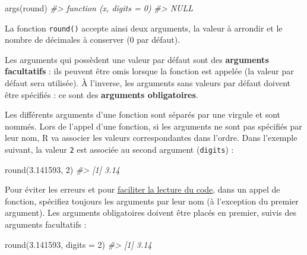 \documentclass[
  french,
]{scrbook}
\newenvironment{Shaded}{\begin{snugshade}}{\end{snugshade}}
\newcommand{\AttributeTok}[1]{\textcolor[rgb]{0.77,0.63,0.00}{#1}}
\newcommand{\CommentTok}[1]{\textcolor[rgb]{0.56,0.35,0.01}{\textit{#1}}}
\newcommand{\DecValTok}[1]{\textcolor[rgb]{0.00,0.00,0.81}{#1}}
\newcommand{\FloatTok}[1]{\textcolor[rgb]{0.00,0.00,0.81}{#1}}
\newcommand{\FunctionTok}[1]{\textcolor[rgb]{0.00,0.00,0.00}{#1}}
\newcommand{\NormalTok}[1]{#1}
\begin{document}
\begin{Shaded}
\begin{Highlighting}[]
\FunctionTok{args}\NormalTok{(round)}
\CommentTok{\#\textgreater{} function (x, digits = 0) }
\CommentTok{\#\textgreater{} NULL}
\end{Highlighting}
\end{Shaded}

La fonction \texttt{round()} accepte ainsi deux arguments, la valeur à arrondir et le nombre de décimales à conserver (0 par défaut).

\begin{tcolorbox}[fonttitle=\sffamily\bfseries\large,title=Remarque,colframe=darkblue]

Les arguments qui possèdent une valeur par défaut sont des \textbf{arguments facultatifs} : ils peuvent être omis lorsque la fonction est appelée (la valeur par défaut sera utilisée). À l'inverse, les arguments sans valeurs par défaut doivent être spécifiés : ce sont des \textbf{arguments obligatoires}.

\end{tcolorbox}

Les différents arguments d'une fonction sont séparés par une virgule et sont nommés. Lors de l'appel d'une fonction, si les arguments ne sont pas spécifiés par leur nom, R va associer les valeurs correspondantes dans l'ordre. Dans l'exemple suivant, la valeur \texttt{2} est associée au second argument (\texttt{digits}) :

\begin{Shaded}
\begin{Highlighting}[]
\FunctionTok{round}\NormalTok{(}\FloatTok{3.141593}\NormalTok{, }\DecValTok{2}\NormalTok{)}
\CommentTok{\#\textgreater{} [1] 3.14}
\end{Highlighting}
\end{Shaded}

Pour éviter les erreurs et pour \protect\hyperlink{style-fonction}{faciliter la lecture du code}, dans un appel de fonction, spécifiez toujours les arguments par leur nom (à l'exception du premier argument). Les arguments obligatoires doivent être placés en premier, suivis des arguments facultatifs :

\begin{Shaded}
\begin{Highlighting}[]
\FunctionTok{round}\NormalTok{(}\FloatTok{3.141593}\NormalTok{, }\AttributeTok{digits =} \DecValTok{2}\NormalTok{)}
\CommentTok{\#\textgreater{} [1] 3.14}
\end{Highlighting}
\end{Shaded}
\end{document}
